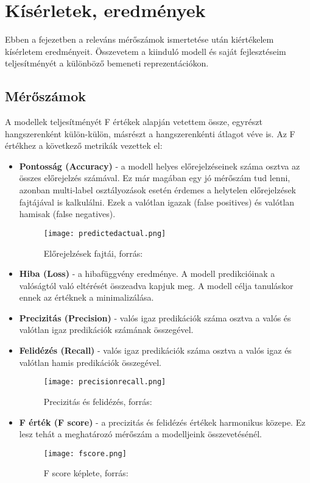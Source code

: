 \chapter{Kísérletek, eredmények} 
\label{ch:results}

Ebben a fejezetben a releváns mérőszámok ismertetése után kiértékelem kísérletem eredményeit. Összevetem a kiinduló modell és saját fejlesztéseim teljesítményét a különböző bemeneti reprezentációkon.

\section{Mérőszámok}

A modellek teljesítményét F értékek alapján vetettem össze, egyrészt hangszerenként külön-külön, másrészt a hangszerenkénti átlagot véve is. Az F értékhez a következő metrikák vezettek el:

\begin{itemize}
\item \textbf{Pontosság (Accuracy)} - a modell helyes előrejelzéseinek száma osztva az összes előrejelzés számával. Ez már magában egy jó mérőszám tud lenni, azonban multi-label osztályozások esetén érdemes a helytelen előrejelzések fajtájával is kalkulálni. Ezek a valótlan igazak (false positives) és valótlan hamisak (false negatives).
\begin{figure}[H]
  \centering
  \texttt{[image: predictedactual.png]}
  \caption{Előrejelzések fajtái, forrás: \cite{fscore}}
\end{figure}

\item \textbf{Hiba (Loss)} - a hibafüggvény eredménye. A modell predikcióinak a valóságtól való eltérését összeadva kapjuk meg. A modell célja tanuláskor ennek az értéknek a minimalizálása.
\item \textbf{Precizitás (Precision)} - valós igaz predikációk száma osztva a valós és valótlan igaz predikációk számának összegével.
\item \textbf{Felidézés (Recall)} - valós igaz predikációk száma osztva a valós igaz és valótlan hamis predikációk összegével.
\begin{figure}[H]
  \centering
  \texttt{[image: precisionrecall.png]}
  \caption{Precizitás és felidézés, forrás: \cite{fscore}}
\end{figure}
\item \textbf{F érték (F score)} - a precizitás és felidézés értékek harmonikus közepe. Ez lesz tehát a meghatározó mérőszám a modelljeink összevetésénél. \cite{fscore}

\begin{figure}[H]
  \centering
  \texttt{[image: fscore.png]}
  \caption{F score képlete, forrás: \cite{fscore}}
\end{figure}
\end{itemize}



